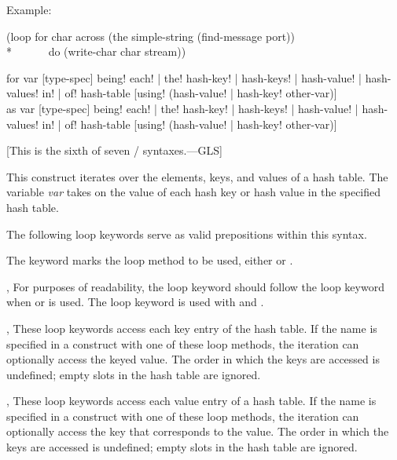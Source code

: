 \begin{new}
\begin{defloop}
  Example:
\begin{lisp}
(loop for char across (the simple-string (find-message port)) \\*
~~~~~~do (write-char char stream))
\end{lisp}
\end{defloop}

\begin{defloop}
for var [type-spec] \!being! {\!each! | \!the!}
                    {\!hash-key! | \!hash-keys! | \!hash-value! | \!hash-values!}
                    {\!in! | \!of!} hash-table [\!using! ({\!hash-value! | \!hash-key!} other-var)] \\
as var [type-spec] \!being! {\!each! | \!the!}
                    {\!hash-key! | \!hash-keys! | \!hash-value! | \!hash-values!}
                    {\!in! | \!of!} hash-table [\!using! ({\!hash-value! | \!hash-key!} other-var)]

[This is the sixth of seven / syntaxes.---GLS]

This construct iterates over the elements, keys, and values of a hash
table.  The variable {\it var\/} takes on the value of each hash key
or hash value in the specified hash table. 

The following loop keywords serve as valid prepositions within this syntax.

\begin{flushdesc}
\item[\cdf{being}]
The keyword  marks the loop method to be used, either 
 or .

\item[\cdf{each}, \cdf{the}]
For purposes of readability, the loop keyword 
should follow the loop keyword  when  or
 is used.  The loop keyword  is used with
 and .

\item[\cdf{hash-key}, \cdf{hash-keys}]
These loop keywords access each key entry of the hash table.  If
the name  is specified in a  construct with one
of these loop methods, the iteration can optionally access the keyed
value. The order in which the keys are accessed is undefined; empty
slots in the hash table are ignored.

\item[\cdf{hash-value}, \cdf{hash-values}]
These loop keywords access each value entry of a hash table.  If
the name  is specified in a  construct with one of
these loop methods, the iteration can optionally access the key that
corresponds to the value.  The order in which the keys are accessed is
undefined; empty slots in the hash table are ignored.


\end{flushdesc}
\end{defloop}
\end{new}
